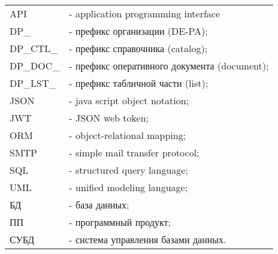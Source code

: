 
\begin{tabular}{p{2.5cm}p{12.2cm}}
    API         & - application programming interface \\
    DP\_        & - префикс организации (DE-PA); \\
    DP\_CTL\_   & - префикс справочника (catalog); \\
    DP\_DOC\_   & - префикс оперативного документа (document); \\
    DP\_LST\_   & - префикс табличной части (list); \\
    JSON        & - java script object notation; \\
    JWT         & - JSON web token; \\
    ORM         & - object-relational mapping; \\
    SMTP        & - simple mail transfer protocol; \\
    SQL         & - structured query language; \\
    UML         & - unified modeling language; \\
    БД          & - база данных; \\
    ПП          & - программный продукт; \\
    СУБД        & - система управления базами данных. \\
\end{tabular}

\newpage
